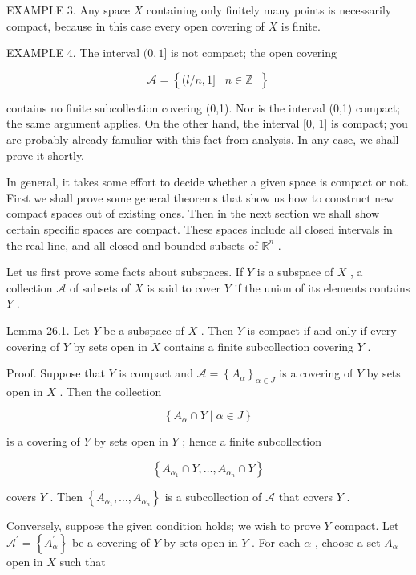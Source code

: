 \documentclass[10pt]{article}
\begin{document}
EXAMPLE 3. Any space \(X\) containing only finitely many points is necessarily compact, because in this case every open covering of \(X\) is finite.

EXAMPLE 4. The interval \((0,1\rbrack\) is not compact; the open covering

\[
\mathcal{A} = \left\{  {(l/n,1\rbrack  \mid  n \in  {\mathbb{Z}}_{ + }}\right\}
\]

contains no finite subcollection covering (0,1). Nor is the interval (0,1) compact; the same argument applies. On the other hand, the interval [0, 1] is compact; you are probably already famuliar with this fact from analysis. In any case, we shall prove it shortly.

In general, it takes some effort to decide whether a given space is compact or not. First we shall prove some general theorems that show us how to construct new compact spaces out of existing ones. Then in the next section we shall show certain specific spaces are compact. These spaces include all closed intervals in the real line, and all closed and bounded subsets of \({\mathbb{R}}^{n}\) .

Let us first prove some facts about subspaces. If \(Y\) is a subspace of \(X\) , a collection \(\mathcal{A}\) of subsets of \(X\) is said to cover \(Y\) if the union of its elements contains \(Y\) .

Lemma 26.1. Let \(Y\) be a subspace of \(X\) . Then \(Y\) is compact if and only if every covering of \(Y\) by sets open in \(X\) contains a finite subcollection covering \(Y\) .

Proof. Suppose that \(Y\) is compact and \(\mathcal{A} = {\left\{  {A}_{\alpha }\right\}  }_{\alpha  \in  J}\) is a covering of \(Y\) by sets open in \(X\) . Then the collection

\[
\left\{  {{A}_{\alpha } \cap  Y \mid  \alpha  \in  J}\right\}
\]

is a covering of \(Y\) by sets open in \(Y\) ; hence a finite subcollection

\[
\left\{  {{A}_{{\alpha }_{1}} \cap  Y,\ldots ,{A}_{{\alpha }_{n}} \cap  Y}\right\}
\]

covers \(Y\) . Then \(\left\{  {{A}_{{\alpha }_{1}},\ldots ,{A}_{{\alpha }_{n}}}\right\}\) is a subcollection of \(\mathcal{A}\) that covers \(Y\) .

Conversely, suppose the given condition holds; we wish to prove \(Y\) compact. Let \({\mathcal{A}}^{\prime } = \left\{  {A}_{\alpha }^{\prime }\right\}\) be a covering of \(Y\) by sets open in \(Y\) . For each \(\alpha\) , choose a set \({A}_{\alpha }\) open in \(X\) such that
\end{document}
